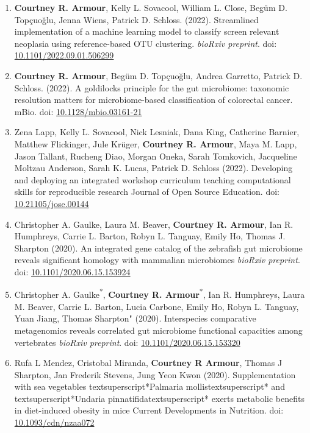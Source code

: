 \documentclass[11pt,a4paper,]{awesome-cv}
\begin{document}
\small
\begin{enumerate}
\item \textbf{Courtney R. Armour}, Kelly L. Sovacool, William L. Close, Begüm D. Topçuoğlu, Jenna Wiens, Patrick D. Schloss. (2022). Streamlined implementation of a machine learning model to classify screen relevant neoplasia using reference-based OTU clustering. \textit{bioRxiv preprint}. doi: \href{https://doi.org/10.1101/2022.09.01.506299}{10.1101/2022.09.01.506299}
\item \textbf{Courtney R. Armour}, Begüm D. Topçuoğlu, Andrea Garretto, Patrick D. Schloss. (2022). A goldilocks principle for the gut microbiome: taxonomic resolution matters for microbiome-based classification of colorectal cancer. mBio. doi: \href{https://doi.org/10.1128/mbio.03161-21}{10.1128/mbio.03161-21}
\item Zena Lapp, Kelly L. Sovacool, Nick Lesniak, Dana King, Catherine Barnier, Matthew Flickinger, Jule Krüger, \textbf{Courtney R. Armour}, Maya M. Lapp, Jason Tallant, Rucheng Diao, Morgan Oneka, Sarah Tomkovich, Jacqueline Moltzau Anderson, Sarah K. Lucas, Patrick D. Schloss (2022). Developing and deploying an integrated workshop curriculum teaching computational skills for reproducible research Journal of Open Source Education. doi: \href{https://doi.org/10.21105/jose.00144}{10.21105/jose.00144}
\item Christopher A. Gaulke, Laura M. Beaver, \textbf{Courtney R. Armour}, Ian R. Humphreys, Carrie L. Barton, Robyn L. Tanguay, Emily Ho, Thomas J. Sharpton (2020). An integrated gene catalog of the zebrafish gut microbiome reveals significant homology with mammalian microbiomes \textit{bioRxiv preprint}. doi: \href{https://doi.org/10.1101/2020.06.15.153924}{10.1101/2020.06.15.153924}
\item Christopher A. Gaulke\textsuperscript{*}, \textbf{Courtney R. Armour}\textsuperscript{*}, Ian R. Humphreys, Laura M. Beaver, Carrie L. Barton, Lucia Carbone, Emily Ho, Robyn L. Tanguay, Yuan Jiang, Thomas Sharpton" (2020). Interspecies comparative metagenomics reveals correlated gut microbiome functional capacities among vertebrates \textit{bioRxiv preprint}. doi: \href{https://doi.org/10.1101/2020.06.15.153320}{10.1101/2020.06.15.153320}
\item Rufa L Mendez, Cristobal Miranda, \textbf{Courtney R Armour}, Thomas J Sharpton, Jan Frederik Stevens, Jung Yeon Kwon (2020). Supplementation with sea vegetables textsuperscript{*}Palmaria mollistextsuperscript{*} and textsuperscript{*}Undaria pinnatifidatextsuperscript{*} exerts metabolic benefits in diet-induced obesity in mice Current Developments in Nutrition. doi: \href{https://doi.org/10.1093/cdn/nzaa072}{10.1093/cdn/nzaa072}

\end{enumerate}
\end{document}
